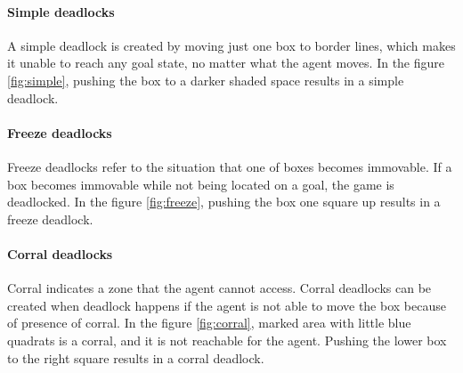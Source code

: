 \documentclass{article}
\begin{document}
\paragraph{Simple deadlocks}
A simple deadlock is created by moving just one box to border lines, which makes it unable to reach any goal state, no matter what the agent moves. In the figure \ref{fig:simple}, pushing the box to a darker shaded space results in a simple deadlock.

\paragraph{Freeze deadlocks}
Freeze deadlocks refer to the situation that one of boxes becomes immovable. If a box becomes immovable while not being located on a goal, the game is deadlocked. In the figure \ref{fig:freeze}, pushing the box one square up results in a freeze deadlock.

\paragraph{Corral deadlocks}
Corral indicates a zone that the agent cannot access. Corral deadlocks can be created when deadlock happens if the agent is not able to move the box because of presence of corral. In the figure \ref{fig:corral}, marked area with little blue quadrats is a corral, and it is not reachable for the agent. Pushing the lower box to the right square results in a corral deadlock.
\end{document}
